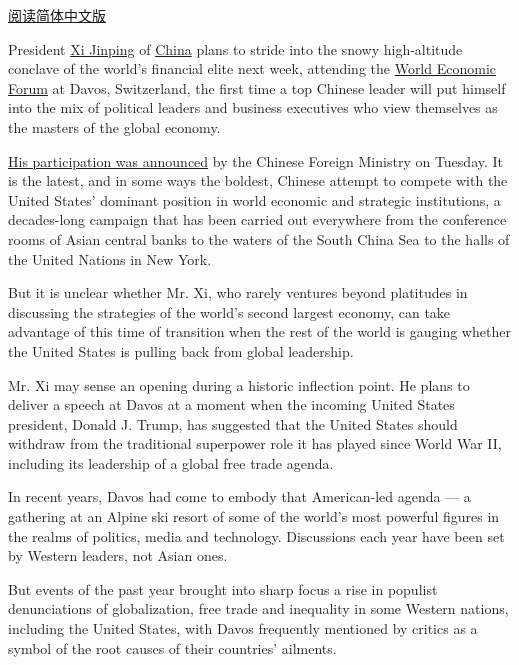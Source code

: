 \href{http://cn.nytimes3xbfgragh.onion/china/20170111/davos-china-xi-jinping-trump/}{阅读简体中文版}

President
\href{https://www.nytimes3xbfgragh.onion/topic/person/xi-jinping?8qa}{Xi
Jinping} of
\href{https://www.nytimes3xbfgragh.onion/topic/destination/china?inline=nyt-geo}{China}
plans to stride into the snowy high-altitude conclave of the world's
financial elite next week, attending the
\href{https://www.weforum.org/agenda/2017/01/how-to-follow-davos-2017}{World
Economic Forum} at Davos, Switzerland, the first time a top Chinese
leader will put himself into the mix of political leaders and business
executives who view themselves as the masters of the global economy.

\href{http://www.fmprc.gov.cn/mfa_eng/xwfw_665399/s2510_665401/2511_665403/t1429431.shtml}{His
participation was announced} by the Chinese Foreign Ministry on Tuesday.
It is the latest, and in some ways the boldest, Chinese attempt to
compete with the United States' dominant position in world economic and
strategic institutions, a decades-long campaign that has been carried
out everywhere from the conference rooms of Asian central banks to the
waters of the South China Sea to the halls of the United Nations in New
York.

But it is unclear whether Mr. Xi, who rarely ventures beyond platitudes
in discussing the strategies of the world's second largest economy, can
take advantage of this time of transition when the rest of the world is
gauging whether the United States is pulling back from global
leadership.

Mr. Xi may sense an opening during a historic inflection point. He plans
to deliver a speech at Davos at a moment when the incoming United States
president, Donald J. Trump, has suggested that the United States should
withdraw from the traditional superpower role it has played since World
War II, including its leadership of a global free trade agenda.

In recent years, Davos had come to embody that American-led agenda --- a
gathering at an Alpine ski resort of some of the world's most powerful
figures in the realms of politics, media and technology. Discussions
each year have been set by Western leaders, not Asian ones.

But events of the past year brought into sharp focus a rise in populist
denunciations of globalization, free trade and inequality in some
Western nations, including the United States, with Davos frequently
mentioned by critics as a symbol of the root causes of their countries'
ailments.

